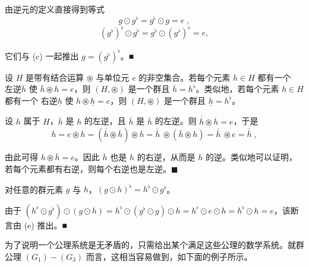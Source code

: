 \begin{remark}
\begin{items}
\proofhead
由逆元的定义直接得到等式
\[
g\odot g^{\flat}=g^{\flat}\odot g=e\;,
\]
\[
\left(g^{\flat}\right)^{\flat}\odot g^{\flat}=g^{\flat}\odot\left(g^{\flat}\right)^{\flat}=e,
\]

它们与 (c) 一起推出 $  g = (g^{\flat})^{\flat}  $。■

\item

设 $H$ 是带有结合运算 $\circledast$ 与单位元 $e$ 的非空集合。若每个元素 $h \in H$ 都有一个 $\text{左} \text{逆} \overline{h}$ 使 $\overline{h} \circledast h = e$，则 $(H, \circledast)$ 是一个群且 $\overline{h} = h^{\flat}$。类似地，若每个元素 $h \in H$ 都有一个 $\text{右} \text{逆} \underline{h}$ 使 $h \circledast \underline{h} = e$，则 $(H, \circledast)$ 是一个群且 $\underline{h} = h^{\flat}$。

\proofhead
设 $h$ 属于 $H$，$\overline{h}$ 是 $h$ 的左逆，且 $\overline{h}$ 是 $\overline{h}$ 的左逆。则 $\overline{\overline{h}} \circledast \overline{h} = e$，于是
\[
h=e\circledast h=\left(\overline{\overline{h}}\circledast\overline{h}\right)\circledast h=\overline{{\overline{{h}}}}~\circledast\left(\overline{{h}}\circledast h\right)=\overline{{\overline{{h}}}}~\circledast e=\overline{{\overline{{h}}}}\;,
\]

由此可得 $ h \circledast \overline{h} = e $。因此 $ \overline{h} $ 也是 $ h $ 的右逆，从而是 $ h $ 的逆。类似地可以证明，若每个元素都有右逆，则每个右逆也是左逆。$ \blacksquare $

\item

对任意的群元素 $ g $ 与 $ h $，$ (g \odot h)^{\flat} = h^{\flat} \odot g^{\flat} $。

\proofhead
由于 $ (h^{\flat}\odot g^{\flat})\odot(g\odot h)=h^{\flat}\odot(g^{\flat}\odot g)\odot h=h^{\flat}\odot e\odot h=h^{\flat}\odot h=e $，该断言由 (e) 推出。■
\end{items}

为了说明一个公理系统是无矛盾的，只需给出某个满足这些公理的数学系统。就群公理 $ (G_{1})-(G_{3}) $ 而言，这相当容易做到，如下面的例子所示。

\end{remark}

